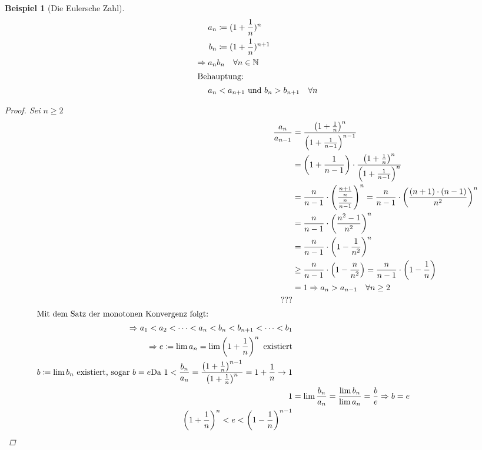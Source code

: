 \documentclass[11pt, twoside, a4paper]{article}
\theoremstyle{plain}
\newtheorem{beispiel}[blockelement]{Beispiel}
\newcommand{\pair}[1]{\left(#1\right)}
\newcommand{\impl}[0]{\Rightarrow{}}
\newcommand{\definedas}[0]{\coloneqq}
\newcommand{\fromto}{\rightarrow{}}
\newcommand{\naturalnumbers}{\mathbb{N}}
\begin{document}
    \begin{beispiel}[Die Eulersche Zahl]
        \begin{align*}
            a_n &\definedas (1+\frac{1}{n})^n\\
            b_n &\definedas (1 + \frac{1}{n})^{n+1}\\
            \impl a_n & b_n\quad\forall n \in\naturalnumbers\\
            \intertext{Behauptung:}
            a_n &< a_{n+1}\text{ und } b_n > b_{n+1} \quad \forall n
        \end{align*}
        \begin{proof}
            Sei $n\geq 2$
            \begin{align*}
                \frac{a_n}{a_{n-1}} &= \frac{\pair{1+\frac{1}{n}}^n}{\pair{1+\frac{1}{n-1}}^{n-1}}\\
                &= \pair{1+\frac{1}{n-1}} \cdot \frac{\pair{1+\frac{1}{n}}^n}{\pair{1+\frac{1}{n-1}}^n}\\
                &= \frac{n}{n-1} \cdot \pair{\frac{\frac{n+1}{n}}{\frac{n}{n-1}}}^n = \frac{n}{n-1}\cdot \pair{\frac{(n+1)\cdot (n-1)}{n^2}}^n\\
                &= \frac{n}{n-1}\cdot \pair{\frac{n^2-1}{n^2}}^n\\
                &= \frac{n}{n-1}\cdot\pair{1-\frac{1}{n^2}}^n\\
                &\geq \frac{n}{n-1}\cdot\pair{1-\frac{n}{n^2}} = \frac{n}{n-1}\cdot\pair{1-\frac{1}{n}}\\
                &= 1 \impl a_n > a_{n-1} \quad \forall n\geq 2\\
                ???\\
                \intertext{Mit dem Satz der monotonen Konvergenz folgt:}
                \impl a_1 < a_2 < \dots < a_n < b_n < b_{n+1} < \dots < b_1\\
                \impl e\definedas \lim a_n = \lim \pair{1+\frac{1}{n}}^n\text{ existiert}\\
                b\definedas \lim b_n\text{ existiert, sogar $b=e$}
                \text{Da } 1 < \frac{b_n}{a_n} = \frac{\pair{1+\frac{1}{n}}^{n-1}}{\pair{1+\frac{1}{n}}^{n}} = 1 + \frac{1}{n} \fromto 1\\
                1 &= \lim \frac{b_n}{a_n} = \frac{\lim b_n}{\lim a_n} = \frac{b}{e} \impl b = e\\
                \pair{1+\frac{1}{n}}^n < e < \pair{1-\frac{1}{n}}^{n-1}
            \end{align*}
        \end{proof}
    \end{beispiel}
\end{document}
